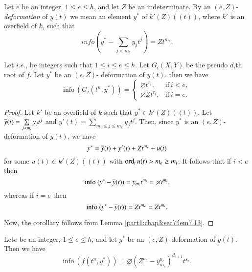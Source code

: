 \begin{defi}\label{part1:chap3:sec7:def7.14}
  Let $e$ be an integer, $1 \leq e \leq h$, and let $Z$ be an indeterminate. By an $(e, Z)$-{\em deformation} of $y(t)$ we mean an element $y^*$ of $k' (Z) ((t))$, where $k'$ is an overfield of $k$, such that
$$
info (y^* - \sum_{j < m_e} y_j t^j) = Z t^{m_e}.
$$
\end{defi}

\begin{coro}\label{part1:chap3:sec7:coro7.15}
  Let $i.e.$, be integers such that $1 \leq i \leq e \leq h$. Let $G_i (X, Y)$ be the pseudo $d_i$th root of $f$. Let $y^*$ be an $(e, Z)$- deformation of $y(t)$. then we have
$$
\text{info}~ (G_i (t^n, y^*)) = 
\begin{cases}
  \diameter t^{r_i}, & \text{if}~ i< e,\\
  \diameter Z t^{r_i}, & \text{if}~ i=e.
\end{cases}
$$
\end{coro}
\begin{proof}
  Let $k'$ be an overfield of $k$ such that $y^* \in k' (Z)((t))$. Let $\overline{y} (t)= \sum\limits_{j < m_i} y_j t^j$ and $y'(t)= \sum\limits_{m_i \leq j \leq m_e} y_j t^j$. Then, since $y^*$ is an $(e, Z)$-deformation of $y(t)$, we have
$$
y^* = \overline{y} (t) + y' (t) + Zt^{m_e} + u(t)
$$
for some $u(t) \in k' (Z) ((t))$ with $\operatorname{ord}_t u(t) > m_e \geq m_i$. It follows that if $i < e$ then
$$
\text{info}~ (y^* - \ob{y} (t)) = y_{m_i}t^{m_i} = \diameter t^{m_i},
$$
whereas if $i=e$ then 
$$
\text{info}~ (y^* - \overline{y} (t)) = Z t^{m_e} = Zt^{m_i}.
$$

Now, the corollary follows from Lemma \ref{part1:chap3:sec7:lem7.13}.
\end{proof}

\begin{lemma}\label{part1:chap3:sec7:lem7.16}
  Let\pageoriginale $e$ be an integer, $1 \leq e \leq h$, and let $y^*$ be an $(e, Z)$-deformation of $y(t)$. Then we have 
$$
\text{info}~ (f (t^n, y^*)) = \diameter (Z^{n_e}- y_{m_e}^{n_e})^{d_{e+1}} t^{s_e}. 
$$
\end{lemma}

